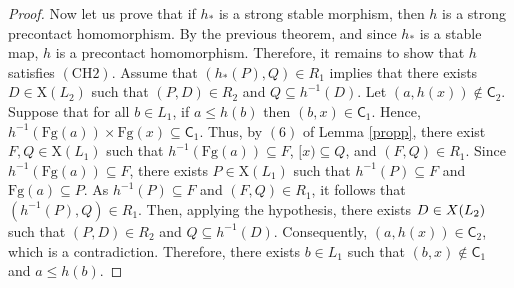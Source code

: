 \documentclass[10pt,a4paper]{amsart}
\begin{document}
\begin{proof}
Now let us prove that if $h_{*}$ is a strong stable morphism, then
$h$ is a strong precontact homomorphism. By the previous theorem,
and since $h_{*}$ is a stable map, $h$ is a precontact homomorphism.
Therefore, it remains to show that $h$ satisfies $\mathrm{(CH2)}$.
Assume that $(h_{*}(P),Q)\in R_{1}$ implies that there exists $D\in{\mathrm{X}}(L_{2})$
such that $(P,D)\in R_{2}$ and $Q\subseteq h^{-1}(D)$. Let $(a,h(x))\notin\mathsf{C}_{2}$.
Suppose that for all $b\in L_{1}$, if $a\leq h(b)$ then $(b,x)\in\mathsf{C}_{1}$.
Hence, $h^{-1}(\mathrm{Fg}(a))\times\mathrm{Fg}(x)\subseteq\mathsf{C}_{1}$.
Thus, by $(6)$ of Lemma \ref{propp}, there exist $F,Q\in{\mathrm{X}}(L_{1})$
such that $h^{-1}(\mathrm{Fg}(a))\subseteq F$, $[x)\subseteq Q$,
and $(F,Q)\in R_{1}$. Since $h^{-1}(\mathrm{Fg}(a))\subseteq F$,
there exists $P\in{\mathrm{X}}(L_{1})$ such that $h^{-1}(P)\subseteq F$
and $\mathrm{Fg}(a)\subseteq P$. As $h^{-1}(P)\subseteq F$ and $(F,Q)\in R_{1}$,
it follows that $(h^{-1}(P),Q)\in R_{1}$. Then, applying the hypothesis,
there exists $D\in{\rm {X}}(L_{2})$ such that $(P,D)\in R_{2}$ and
$Q\subseteq h^{-1}(D)$. Consequently, $(a,h(x))\in\mathsf{C}_{2}$,
which is a contradiction. Therefore, there exists $b\in L_{1}$ such
that $(b,x)\notin\mathsf{C}_{1}$ and $a\leq h(b)$. 
\end{proof}
\end{document}
